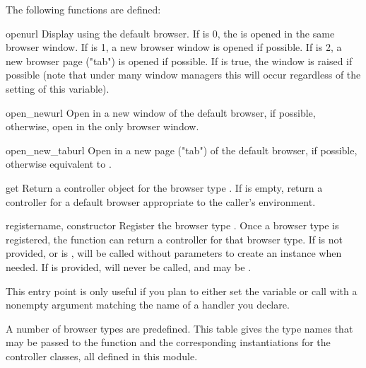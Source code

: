 The following functions are defined:

\begin{funcdesc}{open}{url}
  Display  using the default browser. If  is 0, the
   is opened in the same browser window.  If  is 1,
  a new browser window is opened if possible.  If  is 2,
  a new browser page ("tab") is opened if possible.  If  is
  true, the window is raised if possible (note that under many window
  managers this will occur regardless of the setting of this variable).
\end{funcdesc}

\begin{funcdesc}{open_new}{url}
  Open  in a new window of the default browser, if possible,
  otherwise, open  in the only browser window.
\end{funcdesc}

\begin{funcdesc}{open_new_tab}{url}
  Open  in a new page ("tab") of the default browser, if possible,
  otherwise equivalent to .
\end{funcdesc}

\begin{funcdesc}{get}{}
  Return a controller object for the browser type .  If
   is empty, return a controller for a default browser
  appropriate to the caller's environment.
\end{funcdesc}

\begin{funcdesc}{register}{name, constructor}
  Register the browser type .  Once a browser type is
  registered, the  function can return a controller
  for that browser type.  If  is not provided, or is
  ,  will be called without parameters to
  create an instance when needed.  If  is provided,
   will never be called, and may be .

  This entry point is only useful if you plan to either set the
   variable or call  with a nonempty
  argument matching the name of a handler you declare.
\end{funcdesc}

A number of browser types are predefined.  This table gives the type
names that may be passed to the  function and the
corresponding instantiations for the controller classes, all defined
in this module.

